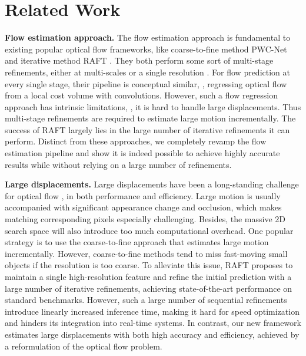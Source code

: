 \documentclass[10pt,twocolumn,letterpaper]{article}
\begin{document}
\section{Related Work}



{\bf Flow estimation approach.} The flow estimation approach is fundamental to existing popular optical flow frameworks, like coarse-to-fine method PWC-Net \cite{sun2018pwc} and iterative method RAFT \cite{teed2020raft}. They both perform some sort of multi-stage refinements, either at multi-scales \cite{sun2018pwc} or a single resolution \cite{teed2020raft}. For flow prediction at every single stage, their pipeline is conceptual similar, \ie, regressing optical flow from a local cost volume with convolutions. However, such a flow regression approach has intrinsic limitations, \ie, it is hard to handle large displacements. Thus multi-stage refinements are required to estimate large motion incrementally. The success of RAFT largely lies in the large number of iterative refinements it can perform. Distinct from these approaches, we completely revamp the flow estimation pipeline and show it is indeed possible to achieve highly accurate results while without relying on a large number of refinements.


{\bf Large displacements.} Large displacements have been a long-standing challenge for optical flow \cite{brox2009large,weinzaepfel2013deepflow,brox2004high,chen2013large,bailer2015flow}, in both performance and efficiency. Large motion is usually accompanied with significant appearance change and occlusion, which makes matching corresponding pixels especially challenging. Besides, the massive 2D search space will also introduce too much computational overhead. One popular strategy is to use the coarse-to-fine approach \cite{hu2016efficient,brox2004high,sun2018pwc} that estimates large motion incrementally. However, coarse-to-fine methods tend to miss fast-moving small objects \cite{revaud2015epicflow} if the resolution is too coarse. To alleviate this issue, RAFT \cite{teed2020raft} proposes to maintain a single high-resolution feature and refine the initial prediction with a large number of iterative refinements, achieving state-of-the-art performance on standard benchmarks. However, such a large number of sequential refinements introduce linearly increased inference time, making it hard for speed optimization and hinders its integration into real-time systems. In contrast, our new framework estimates large displacements with both high accuracy and efficiency, achieved by a reformulation of the optical flow problem.
\end{document}
